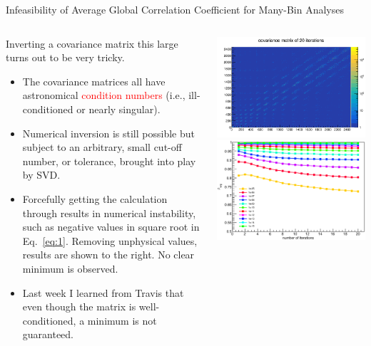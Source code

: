 \documentclass[aspectratio=169]{beamer}
\begin{document}
\begin{frame}{Infeasibility of Average Global Correlation Coefficient for Many-Bin Analyses}
  \begin{columns}
    \begin{column}{.65\textwidth}
    Inverting a covariance matrix this large turns out to be very tricky.
    \begin{itemize}
      \small
      \item The covariance matrices all have astronomical \textcolor{red}{condition numbers} (i.e., ill-conditioned or nearly singular).
      \item Numerical inversion is still possible but subject to an arbitrary, small cut-off number, or tolerance, brought into play by SVD.
      \item Forcefully getting the calculation through results in numerical instability, such as negative values in square root in Eq.~\ref{eq:1}. Removing unphysical values, results are shown to the right. No clear minimum is observed.
      \item Last week I learned from Travis that even though the matrix is well-conditioned, a minimum is not guaranteed.
    \end{itemize}
    \end{column}
    \begin{column}{.35\textwidth}
      \includegraphics[width=\textwidth]{figures/cov_mat_iter20.png} \\
      \includegraphics[width=\textwidth]{figures/avg_rho.eps}

\end{column}
\end{columns}
\end{frame}
\end{document}
